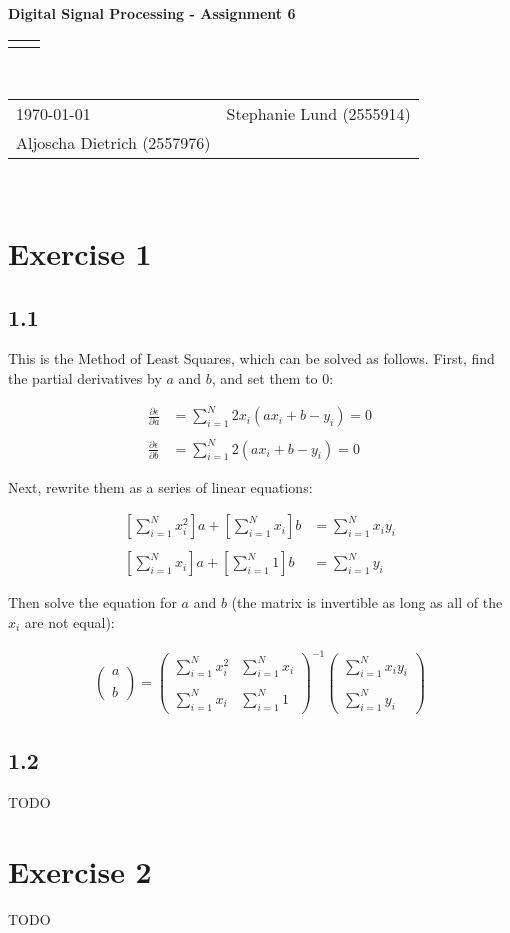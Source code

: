 \documentclass[12pt]{article}
\renewcommand{\title}[1]{\textbf{#1}\\}
\renewcommand{\line}{\begin{tabularx}{\textwidth}{X>{\raggedleft}X}\hline\\\end{tabularx}\\[-0.5cm]}
\newcommand{\leftright}[2]{\begin{tabularx}{\textwidth}{X>{\raggedleft}X}#1%
& #2\\\end{tabularx}\\[-0.5cm]}
\begin{document}
\title{Digital Signal Processing - Assignment 6}
\line
\leftright{\today}{Stephanie Lund (2555914)\\Aljoscha Dietrich (2557976)} %

\section*{Exercise 1}

\subsection*{1.1}
This is the Method of Least Squares, which can be solved as follows. First, find the partial derivatives by $a$ and $b$, and set them to $0$:

\begin{align*}
\frac{\partial \epsilon}{\partial a} &= \sum_{i=1}^N 2x_i(ax_i + b - y_i) = 0 \\\\
\frac{\partial \epsilon}{\partial b} &= \sum_{i=1}^N 2(ax_i + b - y_i) = 0
\end{align*}

Next, rewrite them as a series of linear equations:

\begin{align*}
\left[ \sum_{i=1}^N x_i^2\right]a + \left[ \sum_{i=1}^N x_i\right] b &= \sum_{i=1}^N x_iy_i  \\\\
\left[ \sum_{i=1}^N x_i\right]a + \left[ \sum_{i=1}^N 1\right] b &=  \sum_{i=1}^N y_i
\end{align*}

Then solve the equation for $a$ and $b$ (the matrix is invertible as long as all of the $x_i$ are not equal):

\begin{align*}
\begin{pmatrix}
a\\ \\ b
\end{pmatrix}
=
\begin{pmatrix}
\sum_{i=1}^N x_i^2 & \sum_{i=1}^N x_i\\ \\
\sum_{i=1}^N x_i & \sum_{i=1}^N 1
\end{pmatrix}^{-1}
\begin{pmatrix}
\sum_{i=1}^N x_iy_i\\ \\
\sum_{i=1}^N y_i
\end{pmatrix}
\end{align*}
\subsection*{1.2}
TODO

\section*{Exercise 2}
TODO
\end{document}

